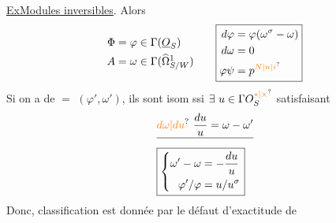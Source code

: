 \uline{Ex}\qquad \uline{Modules inversibles}. Alors
\[
\begin{aligned}
\Phi&=\varphi\in\Gamma(\underline O_S)\\
A&=\omega\in\Gamma(\widehat\Omega^1_{S/W})
\end{aligned}
\qquad
\boxed{\begin{aligned}
d\varphi&=\varphi(\omega^\sigma-\omega)\\
d\omega&=0\\
\varphi\psi&=p^{\unsure{N|n|i}}
\end{aligned}}
\]
Si on a de $=$ $(\varphi',\omega')$, ils sont isom ssi $\exists\ u\in\Gamma O_S^{\unsure{*|\times}}$ satisfaisant
\[
\begin{aligned}
&\deleted{\unsure{d\omega|du}\ \frac{du}{u}=\omega-\omega'}\\
&\boxed{\left\{\begin{aligned}
\omega'-\omega&=-\frac{du}{u}\\
\varphi'/\varphi&=u/u^\sigma
\end{aligned}\right.}
\end{aligned}
\]
Donc, classification est donnée par le défaut d'exactitude de
